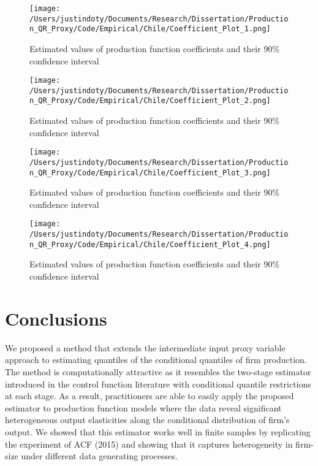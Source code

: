 \documentclass[11pt]{article}
\begin{document}
\begin{figure}[H]
\centering
\caption{Estimated values of production function coefficients and their 90\% confidence interval}
\texttt{[image: /Users/justindoty/Documents/Research/Dissertation/Production\_QR\_Proxy/Code/Empirical/Chile/Coefficient\_Plot\_1.png]}
\end{figure}

\begin{figure}[H]
\centering
\caption{Estimated values of production function coefficients and their 90\% confidence interval}
\texttt{[image: /Users/justindoty/Documents/Research/Dissertation/Production\_QR\_Proxy/Code/Empirical/Chile/Coefficient\_Plot\_2.png]}
\end{figure}

\begin{figure}[H]
\centering
\caption{Estimated values of production function coefficients and their 90\% confidence interval}
\texttt{[image: /Users/justindoty/Documents/Research/Dissertation/Production\_QR\_Proxy/Code/Empirical/Chile/Coefficient\_Plot\_3.png]}
\end{figure}

\begin{figure}[H]
\centering
\caption{Estimated values of production function coefficients and their 90\% confidence interval}
\texttt{[image: /Users/justindoty/Documents/Research/Dissertation/Production\_QR\_Proxy/Code/Empirical/Chile/Coefficient\_Plot\_4.png]}
\end{figure}

\section{Conclusions}

We proposed a method that extends the intermediate input proxy variable approach to estimating quantiles of the conditional quantiles of firm production. The method is computationally attractive as it resembles the two-stage estimator introduced in the control function literature with conditional quantile restrictions at each stage. As a result, practitioners are able to easily apply the proposed estimator to production function models where the data reveal significant heterogeneous output elasticities along the conditional distribution of firm's output. We showed that this estimator works well in finite samples by replicating the experiment of ACF (2015) and showing that it captures heterogeneity in firm-size under different data generating processes.  
\end{document}
